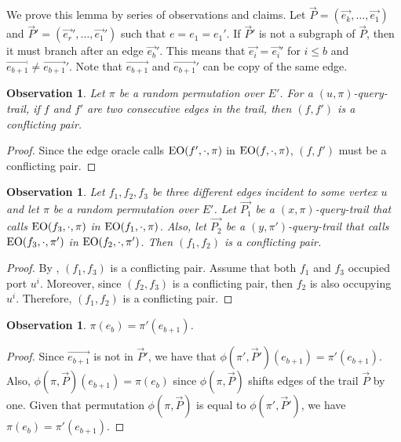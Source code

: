 \documentclass[letterpaper,11pt]{article}
\newcommand{\EO}[0]{\ensuremath{\textup{EO}}}
\newtheorem{observation}[theorem]{Observation}
\newenvironment{myproof}{
\vspace{-0.5cm}
\begin{proof}
}{
\end{proof}
}
\begin{document}
We prove this lemma by series of observations and claims. Let $\vec{P} = (\vec{e_k}, \ldots, \vec{e_1})$ and $\vec{P}'=(\vec{e_r}', \ldots, \vec{e_1}')$ such that $e=e_1=e_1'$. If $\vec{P}'$ is not a subgraph of $\vec{P}$, then it must branch after an edge $\vec{e_b}'$. This means that $\vec{e_i}=\vec{e_i}'$ for $i \leq b$ and $\vec{e_{b+1}} \neq \vec{e_{b+1}}'$. Note that $\vec{e_{b+1}}$ and $\vec{e_{b+1}}'$ can be copy of the same edge. 




\begin{observation}\label{obs:cons-conf}
Let $\pi$ be a random permutation over $E'$. For a $(u, \pi)$-query-trail, if $f$ and $f'$ are two consecutive edges in the trail, then $(f, f')$ is a conflicting pair.
\end{observation}
\begin{myproof}
Since the edge oracle calls $\EO(f', \cdot,\pi)$ in $\EO(f, \cdot, \pi)$, $(f, f')$ must be a conflicting pair.
\end{myproof}

\begin{observation}\label{obs:pair-conf}
Let $f_1, f_2, f_3$ be three different edges incident to some vertex $u$ and let $\pi$ be a random permutation over $E'$. Let $\vec{P_1}$ be a $(x, \pi)$-query-trail that calls $\EO(f_3, \cdot, \pi)$ in $\EO(f_1, \cdot, \pi)$. Also, let $\vec{P_2}$ be a $(y, \pi')$-query-trail that calls $\EO(f_3, \cdot, \pi')$ in $\EO(f_2, \cdot, \pi')$. Then $(f_1, f_2)$ is a conflicting pair.
\end{observation}
\begin{myproof}
By , $(f_1, f_3)$ is a conflicting pair. Assume that both $f_1$ and $f_3$ occupied port $u^i$. Moreover, since $(f_2, f_3)$ is a conflicting pair, then $f_2$ is also occupying $u^i$. Therefore, $(f_1, f_2)$ is a conflicting pair.
\end{myproof}


\begin{observation}\label{obs:equal_edge}
$\pi(e_b) = \pi'(e_{b+1})$.
\end{observation}
\begin{myproof}
Since $\vec{e_{b+1}}$ is not in $\vec{P}'$, we have that $\phi(\pi', \vec{P}')(e_{b+1})=\pi'(e_{b+1})$. Also, $\phi(\pi, \vec{P})(e_{b+1})=\pi(e_b)$ since $\phi(\pi, \vec{P})$ shifts edges of the trail $\vec{P}$ by one. Given that permutation $\phi(\pi, \vec{P})$ is equal to $\phi(\pi', \vec{P}')$, we have $\pi(e_b) = \pi'(e_{b+1})$.
\end{myproof}
\end{document}
